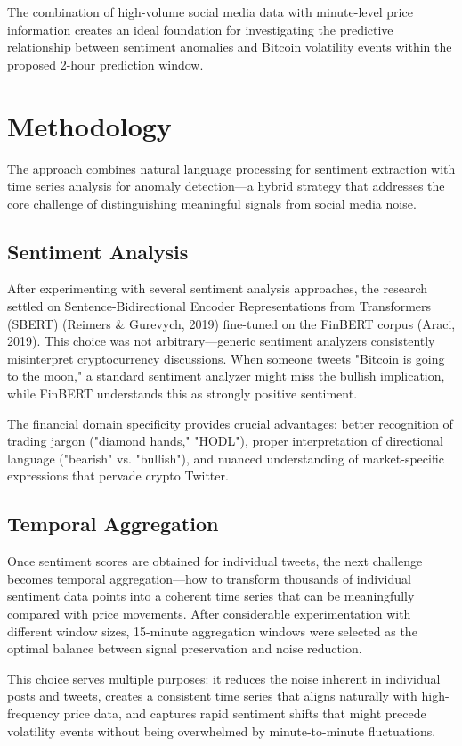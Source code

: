 \documentclass[11pt,twocolumn]{article}
\begin{document}
The combination of high-volume social media data with minute-level price information creates an ideal foundation for investigating the predictive relationship between sentiment anomalies and Bitcoin volatility events within the proposed 2-hour prediction window.

\section{Methodology}
The approach combines natural language processing for sentiment extraction with time series analysis for anomaly detection—a hybrid strategy that addresses the core challenge of distinguishing meaningful signals from social media noise.

\subsection{\textbf{Sentiment Analysis}}
After experimenting with several sentiment analysis approaches, the research settled on Sentence-Bidirectional Encoder Representations from Transformers (SBERT) (Reimers \& Gurevych, 2019) fine-tuned on the FinBERT corpus (Araci, 2019). This choice was not arbitrary—generic sentiment analyzers consistently misinterpret cryptocurrency discussions. When someone tweets "Bitcoin is going to the moon," a standard sentiment analyzer might miss the bullish implication, while FinBERT understands this as strongly positive sentiment.

The financial domain specificity provides crucial advantages: better recognition of trading jargon ("diamond hands," "HODL"), proper interpretation of directional language ("bearish" vs. "bullish"), and nuanced understanding of market-specific expressions that pervade crypto Twitter.

\subsection{\textbf{Temporal Aggregation}}
Once sentiment scores are obtained for individual tweets, the next challenge becomes temporal aggregation—how to transform thousands of individual sentiment data points into a coherent time series that can be meaningfully compared with price movements. After considerable experimentation with different window sizes, 15-minute aggregation windows were selected as the optimal balance between signal preservation and noise reduction.

This choice serves multiple purposes: it reduces the noise inherent in individual posts and tweets, creates a consistent time series that aligns naturally with high-frequency price data, and captures rapid sentiment shifts that might precede volatility events without being overwhelmed by minute-to-minute fluctuations.
\end{document}
